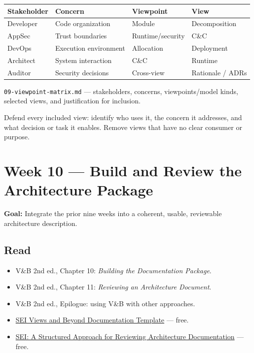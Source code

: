 \documentclass[10pt,letterpaper]{article}
\begin{document}
\begin{tabularx}{\textwidth}{@{}P{0.18\textwidth}P{0.22\textwidth}P{0.25\textwidth}Y@{}}
\toprule
{}\textbf{Stakeholder} & \textbf{Concern} & \textbf{Viewpoint} & \textbf{View} \\
\midrule
Developer & Code organization & Module & Decomposition \\
AppSec & Trust boundaries & Runtime/security & C\&C \\
DevOps & Execution environment & Allocation & Deployment \\
Architect & System interaction & C\&C & Runtime \\
Auditor & Security decisions & Cross-view & Rationale / ADRs \\
\bottomrule
\end{tabularx}

\begin{deliverablebox}
\texttt{09-viewpoint-matrix.md} --- stakeholders, concerns, viewpoints/model kinds, selected views, and justification for inclusion.
\end{deliverablebox}

\begin{masterybox}
Defend every included view: identify who uses it, the concern it addresses, and what decision or task it enables. Remove views that have no clear consumer or purpose.
\end{masterybox}

\section{Week 10 --- Build and Review the Architecture Package}

\textbf{Goal:} Integrate the prior nine weeks into a coherent, usable, reviewable architecture description.

\subsection{Read}
\begin{itemize}
  \item V\&B 2nd ed., Chapter 10: \emph{Building the Documentation Package}.
  \item V\&B 2nd ed., Chapter 11: \emph{Reviewing an Architecture Document}.
  \item V\&B 2nd ed., Epilogue: using V\&B with other approaches.
  \item \href{https://www.sei.cmu.edu/library/views-and-beyond-documentation-template/}{SEI Views and Beyond Documentation Template} --- free.
  \item \href{https://www.sei.cmu.edu/library/a-structured-approach-for-reviewing-architecture-documentation/}{SEI: A Structured Approach for Reviewing Architecture Documentation} --- free.
\end{itemize}
\end{document}
